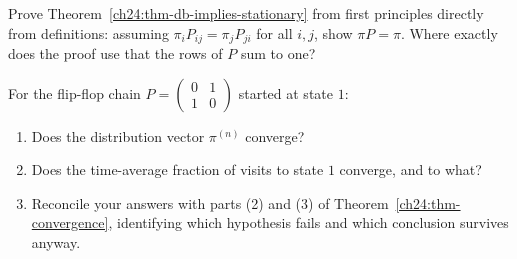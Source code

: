 \begin{exercise}
\label{ch24:ex-proof-db}
Prove Theorem~\ref{ch24:thm-db-implies-stationary} from first principles directly from
definitions: assuming $\pi_i P_{ij} = \pi_j P_{ji}$ for all $i,j$, show $\pi P = \pi$.
Where exactly does the proof use that the rows of $P$ sum to one?
\end{exercise}

\begin{exercise}
\label{ch24:ex-time-avg}
For the flip-flop chain $P=\left(\begin{smallmatrix}0&1\\1&0\end{smallmatrix}\right)$
started at state $1$:
\begin{enumerate}[label=(\alph*)]
  \item Does the distribution vector $\pi^{(n)}$ converge?
  \item Does the time-average fraction of visits to state $1$ converge, and to what?
  \item Reconcile your answers with parts (2) and (3) of Theorem~\ref{ch24:thm-convergence},
    identifying which hypothesis fails and which conclusion survives anyway.
\end{enumerate}
\end{exercise}
